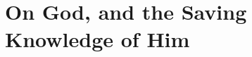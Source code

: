 \documentclass[../main.tex]{subfiles}
\begin{document}
	
	\chapter{On God, and the Saving Knowledge of Him}
	
	
\end{document}
